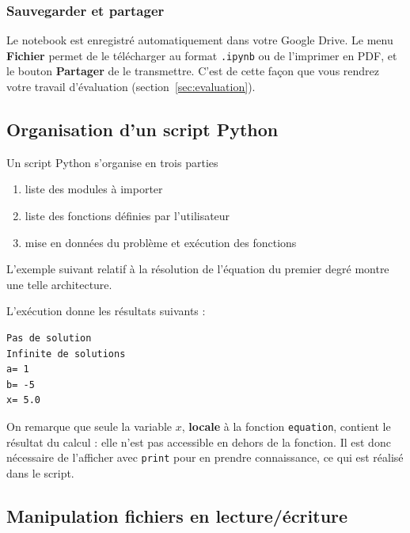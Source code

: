 \documentclass[a4paper,12pt]{article}
\begin{document}
\subsubsection{Sauvegarder et partager}
Le notebook est enregistré automatiquement dans votre Google Drive. Le menu \textbf{Fichier} permet de le télécharger au format \texttt{.ipynb} ou de l'imprimer en PDF, et le bouton \textbf{Partager} de le transmettre. C'est de cette façon que vous rendrez votre travail d'évaluation (section~\ref{sec:evaluation}).

\clearpage
\subsection{Organisation d'un script Python}
Un script Python s'organise en trois parties
\begin{enumerate}
\item liste des modules \`a importer
\item liste des fonctions d\'efinies par l'utilisateur
\item mise en donn\'ees du probl\`eme et ex\'ecution des fonctions
\end{enumerate}

L'exemple suivant relatif \`a la r\'esolution de l'\'equation du premier degr\'e montre une telle architecture.




L'ex\'ecution donne les r\'esultats suivants :
\begin{verbatim}
Pas de solution
Infinite de solutions
a= 1
b= -5
x= 5.0
\end{verbatim}

\begin{leftbar}
On remarque que seule la variable $x$, \textbf{locale} \`a la fonction \texttt{equation}, contient le r\'esultat du calcul : elle n'est pas accessible en dehors de la fonction. Il est donc n\'ecessaire de l'afficher avec \texttt{print} pour en prendre connaissance, ce qui est r\'ealis\'e dans le script.
\end{leftbar}

\clearpage
\subsection{Manipulation fichiers en lecture/\'ecriture}
\end{document}
